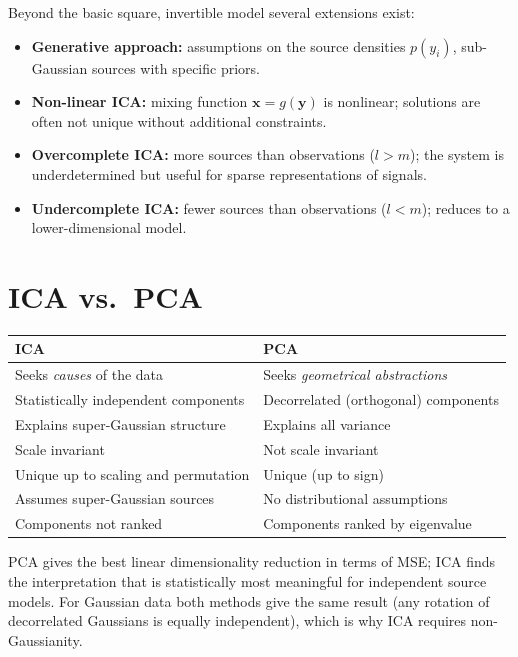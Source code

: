 \documentclass[11pt, oneside]{book}
\begin{document}
Beyond the basic square, invertible model several extensions exist:
\begin{itemize}
  \item \textbf{Generative approach:} assumptions on the source densities $p(y_i)$,
        sub-Gaussian sources with specific priors.
  \item \textbf{Non-linear ICA:} mixing function $\bm{x} = g(\bm{y})$ is nonlinear;
        solutions are often not unique without additional constraints.
  \item \textbf{Overcomplete ICA:} more sources than observations ($l > m$); the system
        is underdetermined but useful for sparse representations of signals.
  \item \textbf{Undercomplete ICA:} fewer sources than observations ($l < m$); reduces
        to a lower-dimensional model.
\end{itemize}


\section{ICA vs.\ PCA}

\begin{center}
\renewcommand{\arraystretch}{1.25}
\begin{tabular}{ll}
  \toprule
  \textbf{ICA} & \textbf{PCA} \\
  \midrule
  Seeks \emph{causes} of the data & Seeks \emph{geometrical abstractions} \\
  Statistically independent components & Decorrelated (orthogonal) components \\
  Explains super-Gaussian structure & Explains all variance \\
  Scale invariant & Not scale invariant \\
  Unique up to scaling and permutation & Unique (up to sign) \\
  Assumes super-Gaussian sources & No distributional assumptions \\
  Components not ranked & Components ranked by eigenvalue \\
  \bottomrule
\end{tabular}
\end{center}

\begin{intbox}
  PCA gives the best linear dimensionality reduction in terms of MSE; ICA finds the
  interpretation that is statistically most meaningful for independent source models.
  For Gaussian data both methods give the same result (any rotation of decorrelated
  Gaussians is equally independent), which is why ICA requires non-Gaussianity.
\end{intbox}
\end{document}
